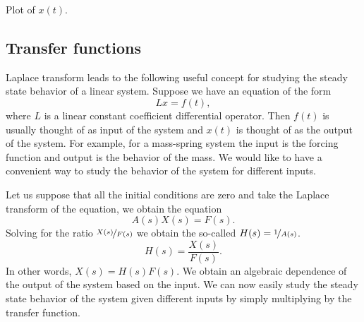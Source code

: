 \begin{example}
\begin{myfig}
\capstart
{}
\caption{Plot of $x(t)$.\label{lt:heavisideexfig}}
\end{myfig}
\end{example}

\subsection{Transfer functions}

Laplace transform leads to the following useful concept for studying the
steady state behavior of a linear system.  Suppose we have an equation of the
form
\begin{equation*}
L x = f(t) ,
\end{equation*}
where $L$ is a linear constant coefficient differential operator.
Then $f(t)$ is usually thought of as input of the system and $x(t)$ is
thought of as the output of the system.  For example, for a mass-spring
system the input is the forcing function and output is the behavior of the
mass.  We would like to have a convenient way to study the behavior of
the system for different inputs.

Let us suppose that
all the initial conditions are zero and take the Laplace transform
of the equation, we obtain the equation
\begin{equation*}
A(s) X(s) = F(s) .
\end{equation*}
Solving for the ratio $\nicefrac{X(s)}{F(s)}$ we obtain the so-called
\emph{}
$H(s) = \nicefrac{1}{A(s)}$.
\begin{equation*}
H(s) = \frac{X(s)}{F(s)} .
\end{equation*}
In other words, $X(s) = H(s) F(s)$.  We obtain an algebraic dependence of
the output of the system based on the input.  We can now easily study the
steady state behavior of the system given different inputs by simply
multiplying by the transfer function.

